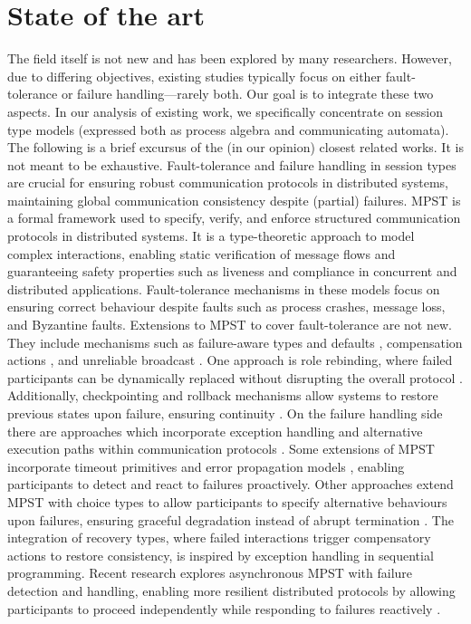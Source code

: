 \documentclass{article}
\theoremstyle{definition}
\theoremstyle{definition}
\begin{document}
\section{State of the art}
 The field itself is not new and has been explored by many researchers. However, due to differing objectives, existing studies typically focus on either fault-tolerance or failure handling—rarely both. Our goal is to integrate these two aspects. In our analysis of existing work, we specifically concentrate on session type models (expressed both as process algebra and communicating automata). The following is a brief excursus of the (in our opinion) closest related works. It is not meant to be exhaustive.
Fault-tolerance and failure handling in session types are crucial for ensuring robust communication protocols in distributed systems, maintaining global communication consistency despite (partial) failures. MPST \cite{Coppo2015,10.1007/978-3-642-28869-2_10} is a formal framework used to specify, verify, and enforce structured communication protocols in distributed systems. It is a type-theoretic approach to model complex interactions, enabling static verification of message flows and guaranteeing safety properties such as liveness and compliance in concurrent and distributed applications. Fault-tolerance mechanisms in these models focus on ensuring correct behaviour despite faults such as process crashes, message loss, and Byzantine faults.
Extensions to MPST to cover fault-tolerance are not new. They include mechanisms such as failure-aware types and defaults \cite{DBLP:journals/lmcs/PetersNW23}, compensation actions \cite{DBLP:journals/mscs/CapecchiGY16}, and unreliable broadcast \cite{DBLP:journals/lmcs/KouzapasGVG24}. One approach is role rebinding, where failed participants can be dynamically replaced without disrupting the overall protocol \cite{10.1145/3485501}. Additionally, checkpointing and rollback mechanisms allow systems to restore previous states upon failure, ensuring continuity \cite{barwell_et_al:LIPIcs.CONCUR.2022.35}. 
On the failure handling side there are approaches which incorporate exception handling \cite{10.1145/3290341} and alternative execution paths within communication protocols \cite{10.1007/s10703-014-0218-8}. Some extensions of MPST incorporate timeout primitives and error propagation models \cite{10.1007/978-3-031-35361-1_12}, enabling participants to detect and react to failures proactively. Other approaches extend MPST with choice types to allow participants to specify alternative behaviours upon failures, ensuring graceful degradation instead of abrupt termination \cite{10.1145/3033019.3033031}. The integration of recovery types, where failed interactions trigger compensatory actions \cite{harvey_et_al:LIPIcs.ECOOP.2021.10} to restore consistency, is inspired by exception handling in sequential programming. Recent research explores asynchronous MPST with failure detection and handling, enabling more resilient distributed protocols by allowing participants to proceed independently while responding to failures reactively \cite{harvey_et_al:LIPIcs.ECOOP.2021.10, DBLP:journals/scp/GiustoP15, DBLP:journals/fac/GiustoP16}.
\end{document}
